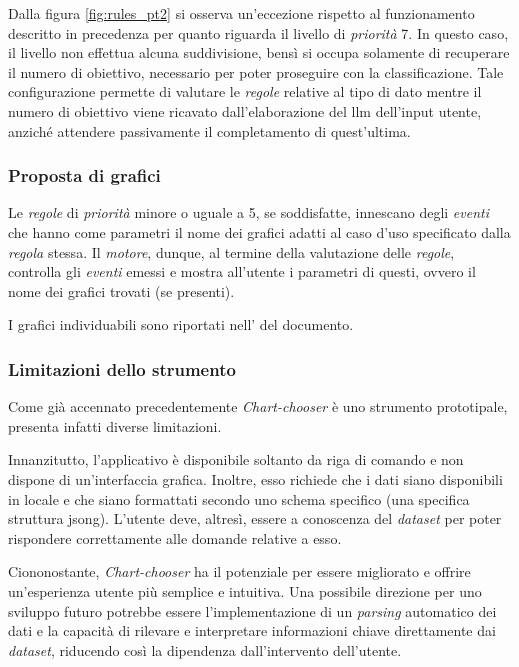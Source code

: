 Dalla figura \ref{fig:rules_pt2} si osserva un'eccezione rispetto al funzionamento descritto in precedenza per quanto riguarda il livello di \emph{priorità} 7. In questo caso, il livello non effettua alcuna suddivisione, 
bensì si occupa solamente di recuperare il numero di obiettivo, necessario per poter proseguire con la classificazione. Tale configurazione permette di valutare le \emph{regole} relative al tipo di dato mentre  
il numero di obiettivo viene ricavato dall'elaborazione del \gls{llm} dell'input utente, anziché attendere passivamente il completamento di quest'ultima.

\subsubsection{Proposta di grafici}
Le \emph{regole} di \emph{priorità} minore o uguale a 5, se soddisfatte, innescano degli \emph{eventi} che hanno come parametri il nome dei grafici adatti al caso d'uso specificato dalla \emph{regola} stessa. 
Il \emph{motore}, dunque, al termine della valutazione delle \emph {regole}, controlla gli \emph{eventi} emessi e mostra all'utente i parametri di questi, ovvero il nome dei grafici trovati (se presenti).

I grafici individuabili sono riportati nell' del documento.

\subsubsection{Limitazioni dello strumento}
Come già accennato precedentemente \emph{Chart-chooser} è uno strumento prototipale, presenta infatti diverse limitazioni.

Innanzitutto, l'applicativo è disponibile soltanto da riga di comando e non dispone di un'interfaccia grafica.
Inoltre, esso richiede che i dati siano disponibili in locale e che siano formattati secondo uno schema specifico
(una specifica struttura \gls{jsong}). 
L'utente deve, altresì, essere a conoscenza del \emph{dataset} per poter rispondere correttamente alle domande relative a esso.

Ciononostante, \emph{Chart-chooser} ha il potenziale per essere migliorato e offrire un'esperienza utente più semplice e intuitiva. 
Una possibile direzione per uno sviluppo futuro potrebbe essere l'implementazione di un \emph{parsing} automatico dei dati e la capacità di 
rilevare e interpretare informazioni chiave direttamente dai \emph{dataset}, riducendo così la dipendenza dall'intervento dell'utente. 